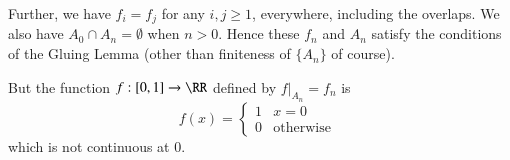 \documentclass{homework}
\newcommand{\nextprob}{\newpage}
\newcommand{\ra}{\rightarrow}
\begin{document}
Further, we have $f_i=f_j$ for any $i,j\ge 1$,
everywhere, including the overlaps.
We also have $A_0\cap A_n=\emptyset$ when $n>0$.
Hence these $f_n$ and $A_n$ satisfy the conditions of the Gluing
Lemma (other than finiteness of $\{A_n\}$ of course).

But the function $f:[0,1]\ra\RR$ defined by $f|_{A_n}=f_n$ is
$$f(x)=\begin{cases}
1 & x=0\\
0 & \text{otherwise }
\end{cases}$$
which is not continuous at 0.





\end{document}
